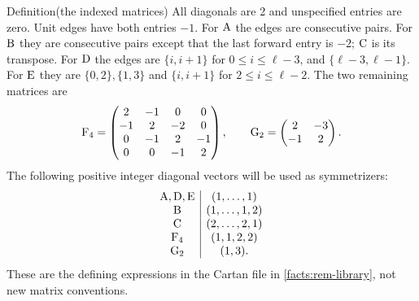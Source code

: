 \begin{namedresult}{Definition}{(the indexed matrices)}\label{def:rem-matrices}
All diagonals are 2 and unspecified entries are zero. Unit edges have
both entries $-1$. For $\mathrm{A}$ the edges are consecutive pairs.
For $\mathrm{B}$ they are consecutive pairs except that the last forward
entry is $-2$; $\mathrm{C}$ is its transpose.
For $\mathrm{D}$ the edges are $\{i,i+1\}$ for $0\leq i\leq\ell-3$,
and $\{\ell-3,\ell-1\}$. For $\mathrm{E}$ they are
$\{0,2\},\{1,3\}$ and $\{i,i+1\}$ for $2\leq i\leq\ell-2$.
The two remaining matrices are
\[
 \mathrm{F}_4=\begin{pmatrix}2&-1&0&0\\-1&2&-2&0\\0&-1&2&-1\\0&0&-1&2\end{pmatrix},
 \qquad \mathrm{G}_2=\begin{pmatrix}2&-3\\-1&2\end{pmatrix}.
\]
The following positive integer diagonal vectors will be used as symmetrizers:
\begin{equation}\label{eq:symmetrizers}
\begin{array}{c|c}
\mathrm{A},\mathrm{D},\mathrm{E}&(1,\ldots,1)\\
\mathrm{B}&(1,\ldots,1,2)\\
\mathrm{C}&(2,\ldots,2,1)\\
\mathrm{F}_4&(1,1,2,2)\\
\mathrm{G}_2&(1,3).
\end{array}
\end{equation}
These are the defining expressions in the Cartan file in
\ref{facts:rem-library}, not new matrix conventions.
\end{namedresult}

